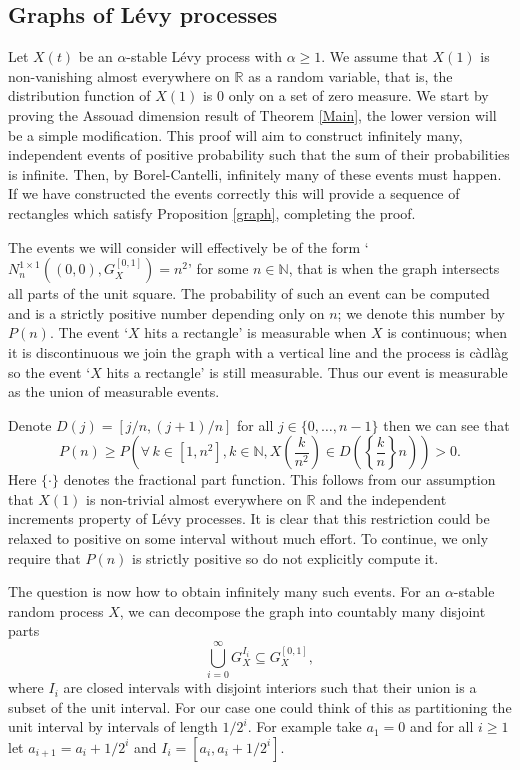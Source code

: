 \subsection{Graphs of L\'evy processes}\label{LP}

Let $X(t)$ be an $\alpha$-stable L\'evy process with $\alpha \ge 1$. We assume that $X(1)$ is non-vanishing almost everywhere on $\mathbb{R}$ as a random variable, that is, the distribution function of $X(1)$ is 0 only on a set of zero measure. We start by proving the Assouad dimension result of Theorem \ref{Main}, the lower version will be a simple modification. This proof will aim to construct infinitely many, independent events of positive probability such that the sum of their probabilities is infinite. Then, by Borel-Cantelli, infinitely many of these events must happen. If we have constructed the events correctly this will provide a sequence of rectangles which satisfy Proposition \ref{graph}, completing the proof.

The events we will consider will effectively be of the form `$N_{n}^{1 \times 1 }((0,0),G_X^{[0,1]})=n^2$' for some $n\in \mathbb{N}$, that is when the graph intersects all parts of the unit square. The probability of such an event can be computed and is a strictly positive number depending only on $n$; we denote this number by $P(n)$. The event `$X$ hits a rectangle' is measurable when $X$ is continuous; when it is discontinuous we join the graph with a vertical line and the process is c\`adl\`ag so the event `$X$ hits a rectangle' is still measurable. Thus our event is measurable as the union of measurable events. 

Denote $D(j)=[j/n,(j+1)/n]$ for all $j\in\{0,\dots, n-1\}$ then we can see that
\[
P(n)\geq P\left(\forall \, k\in\left[1,n^2\right], k\in \mathbb{N},X\left(\frac{k}{n^2}\right)\in D\left(\left\{\frac{k}{n}\right\}n\right)\right)>0.
\]
Here $\{ \cdot \}$ denotes the fractional part function. This follows from our assumption that $X(1)$ is non-trivial almost everywhere on $\mathbb{R}$ and the independent increments property of L\'evy processes. It is clear that this restriction could be relaxed to positive on some interval without much effort. To continue, we only require that $P(n)$ is strictly positive so do not explicitly compute it.


The question is now how to obtain infinitely many such events. For an $\alpha$-stable random process $X$, we can decompose the graph into countably many disjoint parts
\[
\bigcup_{i=0}^\infty G_X^{I_i}\subseteq G_X^{[0,1]},
\]
where $I_i$ are closed intervals with disjoint interiors such that their union is a subset of the unit interval. For our case one could think of this as partitioning the unit interval by intervals of length $1/2^i$. For example take $a_1=0$ and for all $i\geq 1$ let $a_{i+1}=a_i+1/2^i$ and $I_i=[a_i,a_i+1/2^{i}].$

